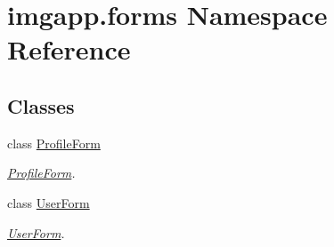 \hypertarget{namespaceimgapp_1_1forms}{}\section{imgapp.\+forms Namespace Reference}
\label{namespaceimgapp_1_1forms}
\subsection*{Classes}
\begin{DoxyCompactItemize}
\item 
class \hyperlink{classimgapp_1_1forms_1_1ProfileForm}{Profile\+Form}
\begin{DoxyCompactList}\small\item\em \hyperlink{classimgapp_1_1forms_1_1ProfileForm}{Profile\+Form}. \end{DoxyCompactList}\item 
class \hyperlink{classimgapp_1_1forms_1_1UserForm}{User\+Form}
\begin{DoxyCompactList}\small\item\em \hyperlink{classimgapp_1_1forms_1_1UserForm}{User\+Form}. \end{DoxyCompactList}\end{DoxyCompactItemize}
